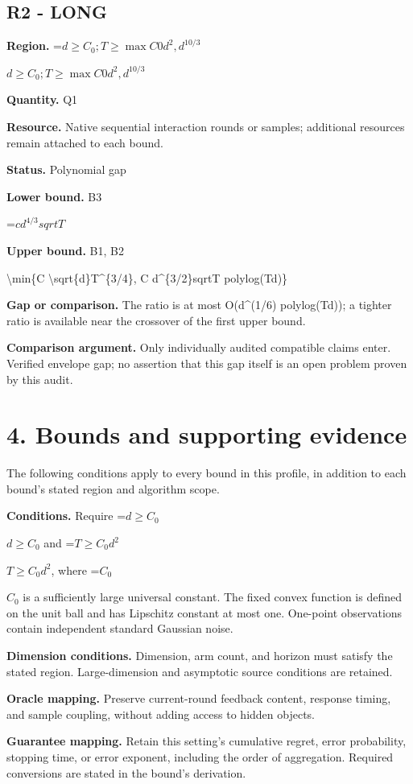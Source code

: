 \documentclass[10pt,a4paper]{article}
\newcommand{\AtlasMath}[1]{\par\begingroup\centering\setbox0=\hbox{$\displaystyle #1$}\ifdim\wd0>1.4\linewidth\typeout{ATLAS WIDE FORMULA: \the\wd0}\fi\ifdim\wd0>\linewidth\resizebox{\linewidth}{!}{\box0}\else\box0\fi\par\endgroup}
\newcommand{\AtlasInlineMath}[1]{\begingroup\setbox0=\hbox{$#1$}\ifdim\wd0>.4\linewidth\endgroup\AtlasMath{#1}\else\endgroup$#1$\fi}
\begin{document}
\subsection{R2 - LONG}
\textbf{Region.} \AtlasInlineMath{d\ge C_0; T\ge \max{C0d^2,d^{10/3}}}

\textbf{Quantity.} Q1

\textbf{Resource.} Native sequential interaction rounds or samples; additional resources remain attached to each bound.

\textbf{Status.} Polynomial gap

\textbf{Lower bound.} B3

\AtlasMath{c d^{4/3}sqrtT}
\textbf{Upper bound.} B1, B2

\textbackslash{}min\{C \textbackslash{}sqrt\{d\}T\textasciicircum{}\{3/4\}, C d\textasciicircum{}\{3/2\}sqrtT polylog(Td)\}

\textbf{Gap or comparison.} The ratio is at most O(d\textasciicircum{}(1/6) polylog(Td)); a tighter ratio is available near the crossover of the first upper bound.

\textbf{Comparison argument.} Only individually audited compatible claims enter. Verified envelope gap; no assertion that this gap itself is an open problem proven by this audit.

\section{4. Bounds and supporting evidence}
The following conditions apply to every bound in this profile, in addition to each bound's stated region and algorithm scope.

\textbf{Conditions.} Require \AtlasInlineMath{d\ge C_0} and \AtlasInlineMath{T\ge C_0d^2}, where \AtlasInlineMath{C_0} is a sufficiently large universal constant. The fixed convex function is defined on the unit ball and has Lipschitz constant at most one. One-point observations contain independent standard Gaussian noise.

\textbf{Dimension conditions.} Dimension, arm count, and horizon must satisfy the stated region. Large-dimension and asymptotic source conditions are retained.

\textbf{Oracle mapping.} Preserve current-round feedback content, response timing, and sample coupling, without adding access to hidden objects.

\textbf{Guarantee mapping.} Retain this setting's cumulative regret, error probability, stopping time, or error exponent, including the order of aggregation. Required conversions are stated in the bound's derivation.
\end{document}
